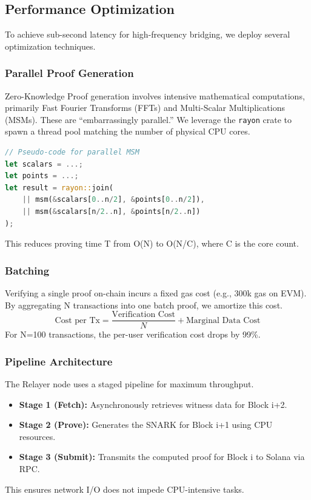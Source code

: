 \documentclass[11pt,a4paper]{article}
\begin{document}
\subsection{Performance Optimization}
To achieve sub-second latency for high-frequency bridging, we deploy several optimization techniques.

\subsubsection{Parallel Proof Generation}
Zero-Knowledge Proof generation involves intensive mathematical computations, primarily Fast Fourier Transforms (FFTs) and Multi-Scalar Multiplications (MSMs). These are ``embarrassingly parallel.'' We leverage the \texttt{rayon} crate to spawn a thread pool matching the number of physical CPU cores.
\begin{lstlisting}[language=Rust, caption={Parallel MSM Example}]
// Pseudo-code for parallel MSM
let scalars = ...;
let points = ...;
let result = rayon::join(
    || msm(&scalars[0..n/2], &points[0..n/2]),
    || msm(&scalars[n/2..n], &points[n/2..n])
);
\end{lstlisting}
This reduces proving time T from O(N) to O(N/C), where C is the core count.

\subsubsection{Batching}
Verifying a single proof on-chain incurs a fixed gas cost (e.g., 300k gas on EVM). By aggregating N transactions into one batch proof, we amortize this cost.
$$ \text{Cost per Tx} = \frac{\text{Verification Cost}}{N} + \text{Marginal Data Cost} $$
For N=100 transactions, the per-user verification cost drops by 99\%.

\subsubsection{Pipeline Architecture}
The Relayer node uses a staged pipeline for maximum throughput.
\begin{itemize}
    \item \textbf{Stage 1 (Fetch):} Asynchronously retrieves witness data for Block i+2.
    \item \textbf{Stage 2 (Prove):} Generates the SNARK for Block i+1 using CPU resources.
    \item \textbf{Stage 3 (Submit):} Transmits the computed proof for Block i to Solana via RPC.
\end{itemize}
This ensures network I/O does not impede CPU-intensive tasks.
\end{document}
